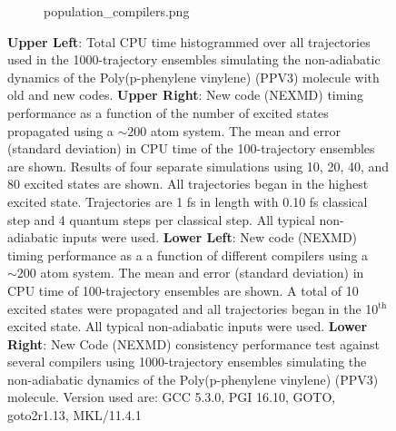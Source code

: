 \documentclass[letterpaper,12pt,titlepage]{article}
\begin{document}
\begin{appendix}
\begin{figure}[h]
\begin{subfigure}[h]{0.425\textwidth}
{population_compilers.png}
        \end{subfigure}
	\caption{\small {\textbf{Upper Left}}: Total CPU time histogrammed over all trajectories used in the 1000-trajectory ensembles simulating the non-adiabatic dynamics of the Poly(p-phenylene vinylene) (PPV3) molecule with old and new codes. {\textbf{Upper Right}}: New code (NEXMD) timing performance as a function of the number of excited states propagated using a $\sim200$ atom system.  The mean and error (standard deviation) in CPU time of the 100-trajectory ensembles are shown.  Results of four separate simulations using 10, 20, 40, and 80 excited states are shown.  All trajectories began in the highest excited state.  Trajectories are 1 fs in length with 0.10 fs classical step and 4 quantum steps per classical step.  All typical non-adiabatic inputs were used.  {\textbf{Lower Left}}: New code (NEXMD) timing performance as a a function of different compilers using a $\sim200$ atom system.  The mean and error (standard deviation) in CPU time of 100-trajectory ensembles are shown.  A total of 10 excited states were propagated and all trajectories began in the 10$^{\text{th}}$ excited state.  All typical non-adiabatic inputs were used.  {\textbf{Lower Right}}: New Code (NEXMD) consistency performance test against several compilers using 1000-trajectory ensembles simulating the non-adiabatic dynamics of the Poly(p-phenylene vinylene) (PPV3) molecule.  Version used are: GCC 5.3.0, PGI 16.10, GOTO, goto2r1.13, MKL/11.4.1}
\end{figure}

\end{appendix}
\end{document}
